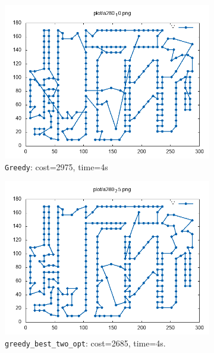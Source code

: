 \begin{figure}[!h]
	\begin{subfigure}{.5\columnwidth}
		\centering
		\includegraphics[width=\columnwidth]{../res/a280_10.png}
		\caption{\texttt{Greedy}: cost=2975, time=4s}
		\label{fig:a280_10}
	\end{subfigure}
	\begin{subfigure}{.5\columnwidth}
		\centering
		\includegraphics[width=\columnwidth]{../res/a280_25.png}
		\caption{\texttt{greedy\_best\_two\_opt}: cost=2685, time=4s.}
		\label{fig:a280_25}
	\end{subfigure}
	\begin{subfigure}{.5\columnwidth}
		\centering

\end{subfigure}
\end{figure}
